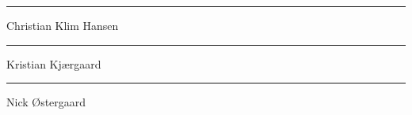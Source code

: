 { \centering

  \vspace{3cm}

  \begin{minipage}{0.7\textwidth}
    \hrule 
    \vspace{1mm}
    Christian Klim Hansen
    \vspace{1.5cm}
    \hrule
    \vspace{1mm}
    Kristian Kjærgaard
    \vspace{1.5cm}
    \hrule
    \vspace{1mm}
    Nick Østergaard
  \end{minipage}

}


